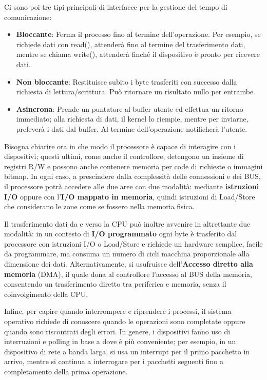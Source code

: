 \noindent Ci sono poi tre tipi principali di interfacce per la gestione del tempo di comunicazione: \begin{itemize}
    \item \textbf{Bloccante}: Ferma il processo fino al termine dell'operazione. Per esempio, se richiede dati con read(), attenderà fino al termine
    del trasferimento dati, mentre se chiama write(), attenderà finché il dispositivo è pronto per ricevere dati.
    \item \textbf{Non bloccante}: Restituisce subito i byte trasferiti con successo dalla richiesta di lettura/scrittura. Può ritornare un risultato
    nullo per entrambe.
    \item \textbf{Asincrona}: Prende un puntatore al buffer utente ed effettua un ritorno immediato; alla richiesta di dati, il kernel lo riempie,
    mentre per inviarne, preleverà i dati dal buffer. Al termine dell'operazione notificherà l'utente.
\end{itemize}

\noindent Bisogna chiarire ora in che modo il processore è capace di interagire con i dispositivi; questi ultimi, come anche il controllore, detengono
un insieme di registri R/W e possono anche contenere memoria per code di richieste o immagini bitmap. In ogni caso, a prescindere dalla complessità
delle connessioni e dei BUS, il processore potrà accedere alle due aree con due modalità: mediante \textbf{istruzioni I/O} oppure con l'\textbf{I/O
mappato in memoria}, quindi istruzioni di Load/Store che considerano le zone come se fossero nella memoria fisica.\par
Il trasferimento dati da e verso la CPU può inoltre avvenire in altrettante due modalità: in un contesto di \textbf{I/O programmato} ogni byte è
trasferito dal processore con istruzioni I/O o Load/Store e richiede un hardware semplice, facile da programmare, ma consuma un numero di cicli macchina
proporzionale alla dimensione dei dati. Alternativamente, si usufruisce dell'\textbf{Accesso diretto alla memoria} (DMA), il quale dona al controllore
l'accesso al BUS della memoria, consentendo un trasferimento diretto tra periferica e memoria, senza il coinvolgimento della CPU.\par
Infine, per capire quando interrompere e riprendere i processi, il sistema operativo richiede di conoscere quando le operazioni sono completate oppure
quando sono riscontrati degli errori. In genere, i dispositivi fanno uso di interruzioni e polling in base a dove è più conveniente; per esempio, in un
dispositivo di rete a banda larga, si usa un interrupt per il primo pacchetto in arrivo, mentre si continua a interrogare per i pacchetti seguenti
fino a completamento della prima operazione.


